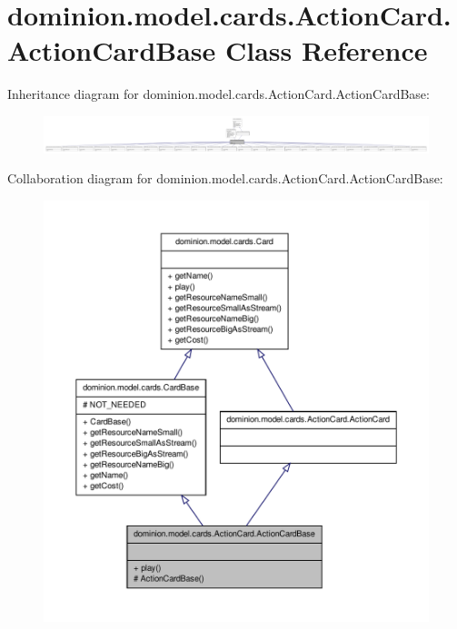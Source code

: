\hypertarget{classdominion_1_1model_1_1cards_1_1ActionCard_1_1ActionCardBase}{\section{dominion.\-model.\-cards.\-Action\-Card.\-Action\-Card\-Base \-Class \-Reference}
\label{classdominion_1_1model_1_1cards_1_1ActionCard_1_1ActionCardBase}
}


\-Inheritance diagram for dominion.\-model.\-cards.\-Action\-Card.\-Action\-Card\-Base\-:
\nopagebreak
\begin{figure}[H]
\begin{center}
\leavevmode
\includegraphics[width=350pt]{classdominion_1_1model_1_1cards_1_1ActionCard_1_1ActionCardBase__inherit__graph}
\end{center}
\end{figure}


\-Collaboration diagram for dominion.\-model.\-cards.\-Action\-Card.\-Action\-Card\-Base\-:
\nopagebreak
\begin{figure}[H]
\begin{center}
\leavevmode
\includegraphics[width=350pt]{classdominion_1_1model_1_1cards_1_1ActionCard_1_1ActionCardBase__coll__graph}
\end{center}
\end{figure}
